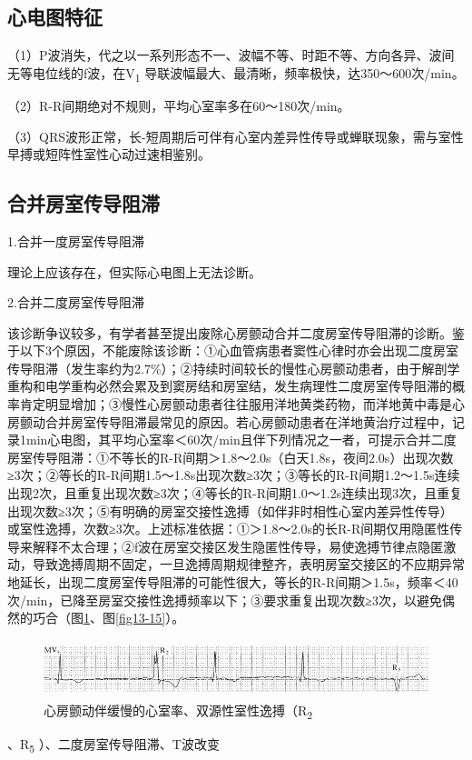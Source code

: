 \protect\hypertarget{text00020.htmlux5cux23subid203}{}{}

\subsection{心电图特征}

（1）P波消失，代之以一系列形态不一、波幅不等、时距不等、方向各异、波间无等电位线的f波，在V\textsubscript{1}
导联波幅最大、最清晰，频率极快，达350～600次/min。

（2）R-R间期绝对不规则，平均心室率多在60～180次/min。

（3）QRS波形正常，长-短周期后可伴有心室内差异性传导或蝉联现象，需与室性早搏或短阵性室性心动过速相鉴别。

\protect\hypertarget{text00020.htmlux5cux23subid204}{}{}

\subsection{合并房室传导阻滞}

1.合并一度房室传导阻滞

理论上应该存在，但实际心电图上无法诊断。

2.合并二度房室传导阻滞

该诊断争议较多，有学者甚至提出废除心房颤动合并二度房室传导阻滞的诊断。鉴于以下3个原因，不能废除该诊断：①心血管病患者窦性心律时亦会出现二度房室传导阻滞（发生率约为2.7\%）；②持续时间较长的慢性心房颤动患者，由于解剖学重构和电学重构必然会累及到窦房结和房室结，发生病理性二度房室传导阻滞的概率肯定明显增加；③慢性心房颤动患者往往服用洋地黄类药物，而洋地黄中毒是心房颤动合并房室传导阻滞最常见的原因。若心房颤动患者在洋地黄治疗过程中，记录1min心电图，其平均心室率＜60次/min且伴下列情况之一者，可提示合并二度房室传导阻滞：①不等长的R-R间期＞1.8～2.0s（白天1.8s，夜间2.0s）出现次数≥3次；②等长的R-R间期1.5～1.8s出现次数≥3次；③等长的R-R间期1.2～1.5s连续出现2次，且重复出现次数≥3次；④等长的R-R间期1.0～1.2s连续出现3次，且重复出现次数≥3次；⑤有明确的房室交接性逸搏（如伴非时相性心室内差异性传导）或室性逸搏，次数≥3次。上述标准依据：①＞1.8～2.0s的长R-R间期仅用隐匿性传导来解释不太合理；②f波在房室交接区发生隐匿性传导，易使逸搏节律点隐匿激动，导致逸搏周期不固定，一旦逸搏周期规律整齐，表明房室交接区的不应期异常地延长，出现二度房室传导阻滞的可能性很大，等长的R-R间期＞1.5s，频率＜40次/min，已降至房室交接性逸搏频率以下；③要求重复出现次数≥3次，以避免偶然的巧合（图\ref{fig13-14}、图\ref{fig13-15}）。

\begin{figure}[!htbp]
 \centering
 \includegraphics[width=5.58333in,height=0.66667in]{./images/Image00222.jpg}
 \captionsetup{justification=centering}
 \caption{心房颤动伴缓慢的心室率、双源性室性逸搏（R\textsubscript{2}}
 \label{fig13-14}
  \end{figure} 
、R\textsubscript{5} ）、二度房室传导阻滞、T波改变

